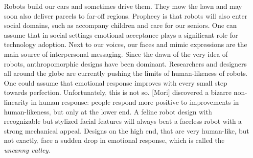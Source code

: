 \documentclass[]{svmono}
\newenvironment{Shaded}{\begin{snugshade}}{\end{snugshade}}
\newcommand{\KeywordTok}[1]{\textcolor[rgb]{0.13,0.29,0.53}{\textbf{#1}}}
\newcommand{\DataTypeTok}[1]{\textcolor[rgb]{0.13,0.29,0.53}{#1}}
\newcommand{\DecValTok}[1]{\textcolor[rgb]{0.00,0.00,0.81}{#1}}
\newcommand{\StringTok}[1]{\textcolor[rgb]{0.31,0.60,0.02}{#1}}
\newcommand{\OperatorTok}[1]{\textcolor[rgb]{0.81,0.36,0.00}{\textbf{#1}}}
\newcommand{\NormalTok}[1]{#1}
\theoremstyle{definition}
\theoremstyle{definition}
\theoremstyle{definition}
\theoremstyle{remark}
\begin{document}
Robots build our cars and sometimes drive them. They mow the lawn and
may soon also deliver parcels to far-off regions. Prophecy is that
robots will also enter social domains, such as accompany children and
care for our seniors. One can assume that in social settings emotional
acceptance plays a significant role for technology adoption. Next to our
voices, our faces and mimic expressions are the main source of
interpersonal messaging. Since the dawn of the very idea of robots,
anthropomorphic designs have been dominant. Researchers and designers
all around the globe are currently pushing the limits of human-likeness
of robots. One could assume that emotional response improves with every
small step towards perfection. Unfortunately, this is not so. {[}Mori{]}
discovered a bizarre non-linearity in human response: people respond
more positive to improvements in human-likeness, but only at the lower
end. A feline robot design with recognizable but stylized facial
features will always beat a faceless robot with a strong mechanical
appeal. Designs on the high end, that are very human-like, but not
exactly, face a sudden drop in emotional response, which is called the
\emph{uncanny valley}.

\begin{Shaded}
\end{Shaded}
\end{document}
